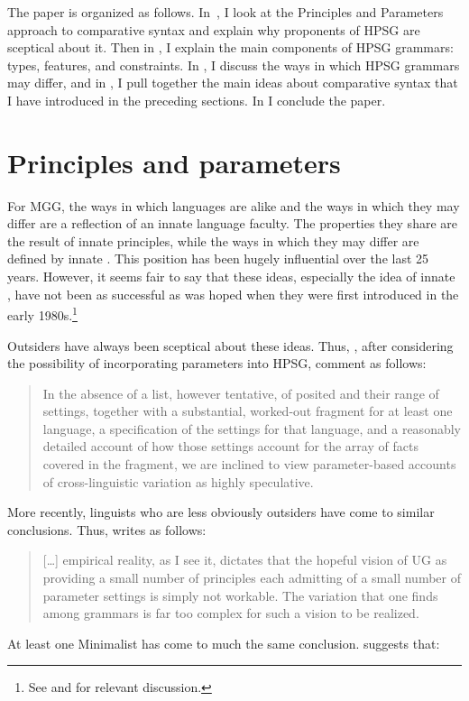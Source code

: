 \documentclass[output=paper]{langsci/langscibook}
\begin{document}
The paper is organized as follows. In~, I look at the Principles
and Parameters approach to comparative syntax and explain why proponents of
\gls{HPSG} are sceptical about it. Then in , I explain the main
components of \gls{HPSG} grammars: types, features, and constraints. In
, I discuss the ways in which \gls{HPSG} grammars may differ, and
in , I pull together the main ideas about comparative syntax that
I have introduced in the preceding sections. In  I
conclude the paper.

\section{Principles and parameters}\label{sec-5:2}

For \gls{MGG}, the ways in which languages are alike and the ways in which they
may differ are a reflection of an innate language faculty. The properties they
share are the result of innate principles, while the ways in which they may
differ are defined by innate . This position has been hugely
influential over the last 25 years. However, it seems fair to say that these
ideas, especially the idea of innate , have not been as successful as
was hoped when they were first introduced in the early 1980s.\footnote{See
\citet{Newmeyer2005} and \citet{Haspelmath2008} for relevant discussion.}

\largerpage[1]
Outsiders have always been sceptical about these ideas. Thus,
\citet[31]{PolSag1994}, after considering the possibility of incorporating
parameters into \gls{HPSG}, comment as
follows:

\blockquote{In the absence of a list, however tentative, of posited  and their
range of settings, together with a substantial, worked-out fragment for at
least one language, a specification of the settings for that language, and a
reasonably detailed account of how those settings account for the array of
facts covered in the fragment, we are inclined to view parameter-based accounts
of cross-linguistic variation as highly speculative.}
%
More recently, linguists who are less obviously outsiders have come to similar
conclusions. Thus, \citet[75]{Newmeyer2005} writes as follows:

\blockquote{[\dots{}] empirical reality, as I see it, dictates that the hopeful
    vision of UG as providing a small number of principles each admitting of a
    small number of parameter settings is simply not workable. The variation
    that one finds among grammars is far too complex for such a vision to be
realized.}
%
At least one Minimalist has come to much the same conclusion.
\citet{Boeckx2011b} suggests that:
\end{document}
